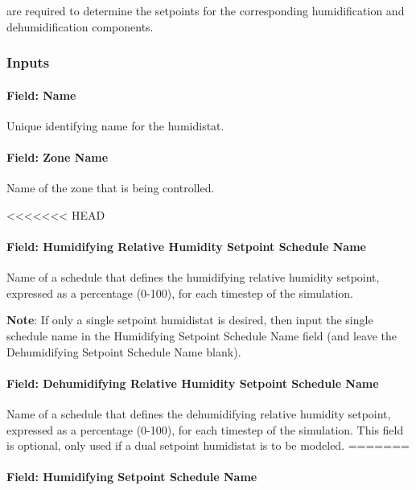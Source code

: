 are required to determine the setpoints for the corresponding humidification and dehumidification components.

\subsubsection{Inputs}\label{inputs-8-028}

\paragraph{Field: Name}\label{field-name-6-026}

Unique identifying name for the humidistat.

\paragraph{Field: Zone Name}\label{field-zone-name-014}

Name of the zone that is being controlled.

<<<<<<< HEAD
\paragraph{Field: Humidifying Relative Humidity Setpoint Schedule Name}\label{field-humidifying-relative-humidity-setpoint-schedule-name}

Name of a schedule that defines the humidifying relative humidity setpoint, expressed as a percentage (0-100), for each timestep of the simulation.

\textbf{Note}: If only a single setpoint humidistat is desired, then input the single schedule name in the Humidifying Setpoint Schedule Name field (and leave the Dehumidifying Setpoint Schedule Name blank).

\paragraph{Field: Dehumidifying Relative Humidity Setpoint Schedule Name}\label{field-dehumidifying-relative-humidity-setpoint-schedule-name-1}

Name of a schedule that defines the dehumidifying relative humidity setpoint, expressed as a percentage (0-100), for each timestep of the simulation. This field is optional, only used if a dual setpoint humidistat is to be modeled.
=======
\paragraph{Field: Humidifying Setpoint Schedule Name}\label{field-humidifying-setpoint-schedule-name}


